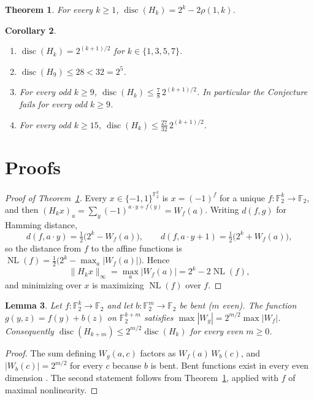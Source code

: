 \documentclass[11pt]{amsart}
\newtheorem{theorem}{Theorem}
\newtheorem{corollary}[theorem]{Corollary}
\newtheorem{lemma}[theorem]{Lemma}
\theoremstyle{remark}
\newcommand{\F}{\mathbb{F}_2}
\newcommand{\disc}{\operatorname{disc}}
\newcommand{\NL}{\operatorname{NL}}
\begin{document}
\begin{theorem}\label{thm:main}
For every $k\ge1$, $\disc(H_k)=2^k-2\rho(1,k)$.
\end{theorem}

\begin{corollary}\label{cor}
\begin{enumerate}
\item $\disc(H_k)=2^{(k+1)/2}$ for $k\in\{1,3,5,7\}$.
\item $\disc(H_9)\le 28<32=2^{5}$.
\item For every odd $k\ge9$, $\disc(H_k)\le \tfrac78\,2^{(k+1)/2}$. In particular the
Conjecture fails for every odd $k\ge 9$.
\item For every odd $k\ge15$, $\disc(H_k)\le \tfrac{27}{32}\,2^{(k+1)/2}$.
\end{enumerate}
\end{corollary}

\section{Proofs}

\begin{proof}[Proof of Theorem~\ref{thm:main}]
Every $x\in\{-1,1\}^{\F^k}$ is $x=(-1)^f$ for a unique $f\colon\F^k\to\F$, and then
$(H_kx)_a=\sum_y(-1)^{a\cdot y+f(y)}=W_f(a)$. Writing $d(f,g)$ for Hamming
distance,
\[
d(f,a\cdot y)=\tfrac12\bigl(2^k-W_f(a)\bigr),\qquad
d(f,a\cdot y+1)=\tfrac12\bigl(2^k+W_f(a)\bigr),
\]
so the distance from $f$ to the affine functions is
$\NL(f)=\tfrac12\bigl(2^k-\max_a|W_f(a)|\bigr)$. Hence
\[
\|H_kx\|_\infty=\max_a|W_f(a)|=2^k-2\NL(f),
\]
and minimizing over $x$ is maximizing $\NL(f)$ over $f$.
\end{proof}

\begin{lemma}\label{lem:sum}
Let $f\colon\F^k\to\F$ and let $b\colon\F^m\to\F$ be bent ($m$ even). The function
$g(y,z)=f(y)+b(z)$ on $\F^{k+m}$ satisfies $\max|W_g|=2^{m/2}\max|W_f|$.
Consequently $\disc(H_{k+m})\le 2^{m/2}\disc(H_k)$ for every even $m\ge0$.
\end{lemma}

\begin{proof}
The sum defining $W_g(a,c)$ factors as $W_f(a)\,W_b(c)$, and $|W_b(c)|=2^{m/2}$
for every $c$ because $b$ is bent. Bent functions exist in every even
dimension \cite{Rothaus}. The second statement follows from
Theorem~\ref{thm:main}, applied with $f$ of maximal nonlinearity.
\end{proof}
\end{document}
